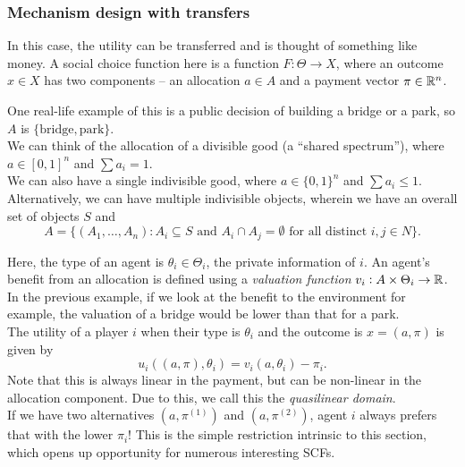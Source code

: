 	\subsubsection{Mechanism design with transfers}

		In this case, the utility can be transferred and is thought of something like money. A social choice function here is a function $F : \Theta \to X$, where an outcome $x \in X$ has two components -- an allocation $a \in A$ and a payment vector $\pi \in \mathbb{R}^n$.

		\begin{fex}
			\label{ex: payment irl examples}
			One real-life example of this is a public decision of building a bridge or a park, so $A$ is $\{\text{bridge},\text{park}\}$.\\
			We can think of the allocation of a divisible good (a ``shared spectrum''), where $a \in [0,1]^n$ and $\sum a_i = 1$.\\
			We can also have a single indivisible good, where $a \in \{0,1\}^n$ and $\sum a_i \le 1$.\\
			Alternatively, we can have multiple indivisible objects, wherein we have an overall set of objects $S$ and
			\[ A = \{ (A_1,\ldots,A_n) : A_i \subseteq S\text{ and }A_i \cap A_j = \emptyset \text{ for all distinct $i,j \in N$} \}. \]
		\end{fex}

		Here, the type of an agent is $\theta_i \in \Theta_i$, the private information of $i$. An agent's benefit from an allocation is defined using a \emph{valuation function} $v_i : A \times \Theta_i \to \mathbb{R}$.\\
		In the previous example, if we look at the benefit to the environment for example, the valuation of a bridge would be lower than that for a park.\\

		The utility of a player $i$ when their type is $\theta_i$ and the outcome is $x = (a,\pi)$ is given by
		\[ u_i( (a,\pi) , \theta_i ) = v_i(a,\theta_i) - \pi_i. \]
		Note that this is always linear in the payment, but can be non-linear in the allocation component. Due to this, we call this the \emph{quasilinear domain}. \\
		If we have two alternatives $(a,\pi^{(1)})$ and $(a,\pi^{(2)})$, agent $i$ always prefers that with the lower $\pi_i$! This is the simple restriction intrinsic to this section, which opens up opportunity for numerous interesting SCFs.\\

